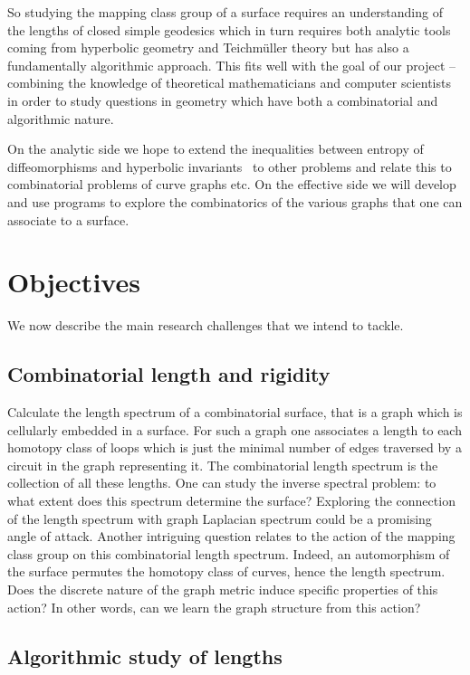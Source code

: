 \documentclass[14pt,fleqn]{article}
\begin{document}
So studying the mapping class group of a surface 
requires 
an understanding 
of the lengths of closed simple geodesics
which in turn 
requires both analytic tools
coming from hyperbolic geometry and Teichmüller theory 
but has also a fundamentally
algorithmic approach.
This fits well with the  goal of our project -- combining the knowledge of theoretical
mathematicians and computer scientists in order to study questions in
geometry
which have both a combinatorial and algorithmic nature.  



On the analytic side we hope to extend the
inequalities between entropy of diffeomorphisms and hyperbolic
invariants~\cite{km-nevvp-18} to other problems and relate this to combinatorial problems
of curve graphs etc. On the effective side we will develop and use
programs to explore the combinatorics of the various graphs that one
can associate to a surface.



\section{Objectives}
We now describe the main research challenges that we intend to tackle. 


\subsection{Combinatorial length and rigidity}
 Calculate the length
spectrum of a combinatorial surface, that is a graph which is
cellularly embedded in a surface.  For such a graph one associates a
length to each homotopy class of loops which is just the minimal
number of edges traversed by a circuit in the graph representing
it. The combinatorial length spectrum is the collection of all these
lengths. One can study the inverse spectral problem: to what extent
does this spectrum determine the surface? Exploring the connection of the length spectrum with graph Laplacian spectrum could be a promising angle of attack. Another intriguing question relates to the action of the mapping class group on this combinatorial length spectrum. Indeed, an automorphism of the
 surface permutes the homotopy class of curves, hence the length spectrum. Does the discrete nature of the graph metric induce specific properties of this action? In other words, can we learn the graph structure from this action?

\subsection{Algorithmic study of lengths}
\end{document}

